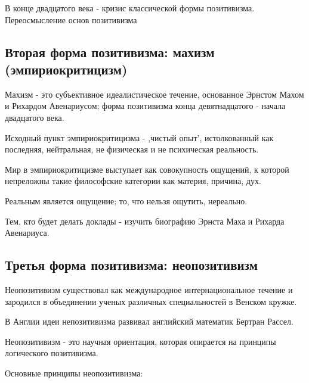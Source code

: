 \documentclass{article}
\begin{document}
В конце двадцатого века - кризис классической формы позитивизма. Переосмысление основ позитивизма

\subsection{Вторая форма позитивизма: махизм (эмпириокритицизм)}

Махизм - это субъективное идеалистическое течение, основанное Эрнстом Махом и Рихардом Авенариусом; форма позитивизма конца девятнадцатого - начала двадцатого века.

Исходный пункт эмпириокритицизма - ,чистый опыт', истолкованный как последняя, нейтральная, не физическая и не психическая реальность.

Мир в эмпириокритицизме выступает как совокупность ощущений, к которой непреложны такие философские категории как материя, причина, дух.

Реальным является ощущение; то, что нельзя ощутить, нереально.

Тем, кто будет делать доклады - изучить биографию Эрнста Маха и Рихарда Авенариуса.

\subsection{Третья форма позитивизма: неопозитивизм}

Неопозитивизм существовал как международное интернациональное течение и зародился в объединении ученых различных специальностей в Венском кружке.

В Англии идеи непозитивизма развивал английский математик Бертран Рассел.

Неопозитивизм - это научная ориентация, которая опирается на принципы логического позитивизма.

Основные принципы неопозитивизма:
\end{document}
